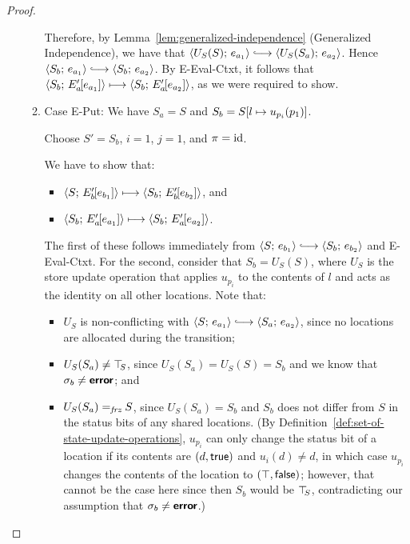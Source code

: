 \begin{proof}
\begin{enumerate}
\begin{enumerate}
      Therefore, by Lemma~\ref{lem:generalized-independence}
      (Generalized Independence), we have that
      $\config{U_S(S)}{e_{a_1}} \parstepsto
      \config{U_S(S_a)}{e_{a_2}}$.  Hence $\config{S_b}{e_{a_1}}
      \parstepsto \config{S_b}{e_{a_2}}$.  By {\sc E-Eval-Ctxt}, it
      follows that $\langle S_b;\, E'_a\hspace{-1mm}\left[e_{a_1}\right] \rangle \longmapsto
      \langle S_b;\, E'_a\hspace{-1mm}\left[e_{a_2}\right] \rangle$, as we were required to
      show.

    \item \label{slqc-beta-put}Case {\sc E-Put}: We have $S_a = S$ and
      $S_b = S[l \mapsto u_{p_i}(p_1)]$.

      Choose $S' = S_b$, $i = 1$, $j = 1$, and $\pi = \mathrm{id}$.

      We have to show that:
      \begin{itemize}
      \item $\langle S;\, E'_b\hspace{-1mm}\left[e_{b_1}\right] \rangle \longmapsto
        \langle S_b;\, E'_b\hspace{-1mm}\left[e_{b_2}\right] \rangle$, and
      \item
        $\langle S_b;\, E'_a\hspace{-1mm}\left[e_{a_1}\right] \rangle \longmapsto
        \langle S_b;\, E'_a\hspace{-1mm}\left[e_{a_2}\right] \rangle$.
      \end{itemize}

      The first of these follows immediately from $\config{S}{e_{b_1}}
      \parstepsto \config{S_b}{e_{b_2}}$ and {\sc E-Eval-Ctxt}.  For
      the second, consider that $S_b = U_S(S)$, where $U_S$ is the
      store update operation that applies $u_{p_i}$ to the contents of
      $l$ and acts as the identity on all other locations.  Note that:
      \begin{itemize}
      \item $U_S$ is non-conflicting with $\config{S}{e_{a_1}}
        \parstepsto \config{S_a}{e_{a_2}}$, since no locations are
        allocated during the transition;
        \item $U_S(S_a) \neq \top\hspace{-0.85mm}_{S}$, since $U_S(S_a) = U_S(S) = S_b$
          and we know that $\sigma_b \neq \textbf{\textsf{error}}$; and
        \item $U_S(S_a) =_{\textit{frz}} S$, since $U_S(S_a) = S_b$ and $S_b$
          does not differ from $S$ in the status bits of any shared
          locations.  (By
          Definition~\ref{def:set-of-state-update-operations},
          $u_{p_i}$ can only change the status bit of a location if
          its contents are $(d, \textsf{true})$ and $u_i(d) \neq
          d$, in which case $u_{p_i}$ changes the contents of the
          location to $(\top, \textsf{false})$; however, that
          cannot be the case here since then $S_b$ would be $\top\hspace{-0.85mm}_{S}$,
          contradicting our assumption that $\sigma_b \neq \textbf{\textsf{error}}$.)
      \end{itemize}


\end{enumerate}
\end{enumerate}
\end{proof}
